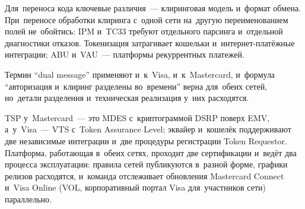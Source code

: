 Для~переноса кода ключевые различия~--- клиринговая модель и~формат обмена.
При~переносе обработки клиринга с~одной сети на~другую переименованием полей
не~обойтись: IPM и~TC33 требуют отдельного парсинга и~отдельной диагностики
отказов. Токенизация затрагивает кошельки и~интернет-платёжные интеграции;
ABU и~VAU~--- платформы рекуррентных платежей.

Термин \enquote{dual message} применяют и~к~Visa, и~к~Mastercard, и~формула
\enquote{авторизация и~клиринг разделены во~времени} верна для~обеих сетей,
но~детали разделения и~техническая реализация у~них расходятся.

TSP у~Mastercard~--- это MDES с~криптограммой DSRP поверх EMV, а~у~Visa~--- VTS
с~Token Assurance Level; эквайер и~кошелёк поддерживают две независимые
интеграции и~две процедуры регистрации Token Requestor. Платформа, работающая
в~обеих сетях, проходит две сертификации и~ведёт два процесса эксплуатации:
правила сетей публикуются в~разной форме, графики релизов расходятся, и~команда
отслеживает обновления Mastercard Connect и~Visa Online (VOL, корпоративный
портал Visa для~участников сети) параллельно.


